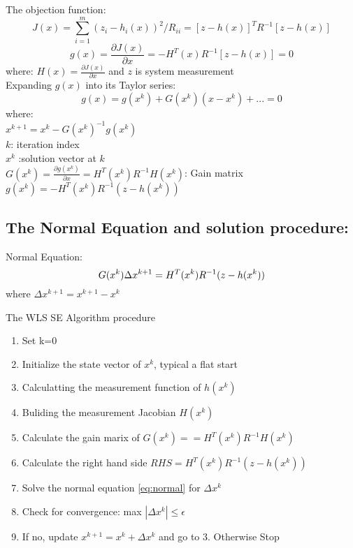 \documentclass[12pt]{article}
\begin{document}
The objection function:
\begin{equation}\label{eq:JX}
J(x)=\sum_{i=1}^{m}(z_i-h_i(x))^2/R_{ii} = [z-h(x)]^TR^{-1}[z-h(x)] 
\end{equation} 
\begin{equation}\label{eq:gx}
g(x)=\frac{\partial J(x)}{\partial x} = -H^T(x)R^{-1}[z-h(x)] = 0 
\end{equation} 
where: $H(x)=\frac{\partial J(x)}{\partial x}$ and $z$ is system measurement\\
Expanding $g(x)$ into its Taylor series:
\begin{equation}\label{eq:Taylor}
g(x)= g(x^k) + G(x^k)(x-x^k) + ... = 0
\end{equation} 
where: \\
$x^{k+1} = x^k - G(x^k)^{-1}g(x^k)$ \\
$k$: iteration index \\
$x^k$ :solution vector at $k$\\
$G(x^k) = \frac{\partial g(x^k)}{\partial x} = H^T(x^k)R^{-1}H(x^k)$: Gain matrix \\
$g(x^k) = -H^T(x^k)R^{-1}(z-h(x^k))$ \\

\subsection*{The Normal Equation and solution procedure:}
Normal Equation: \\ 
\begin{equation}\label{eq:normal}
G(x^k)\Delta x^{k+1} = H^T(x^k)R^{-1}(z-h(x^k)) \\*
\end{equation} 
where $\Delta x^{k+1} = x^{k+1}-x^k$

The WLS SE Algorithm procedure
\begin{enumerate}
\item Set k=0
\item Initialize the state vector of $x^{k}$, typical a flat start
\item Calculatting the measurement function of $h(x^k)$
\item Buliding the measurement Jacobian $H(x^k)$
\item Calculate the gain marix of $G(x^k)== H^T(x^k)R^{-1}H(x^k)$
\item Calculate the right hand side $RHS = H^T(x^k)R^{-1}(z-h(x^k))$
\item Solve the normal equation \ref{eq:normal} for $\Delta x^k$
\item Check for convergence: max $\left |  \Delta x^k \right |\le \epsilon $
\item If no, update $x^{k+1} = x^k+\Delta x^k$ and go to 3. Otherwise Stop
\end{enumerate}
\end{document}
